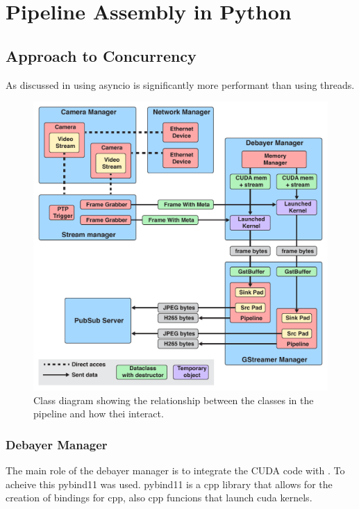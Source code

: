 
\chapter{Pipeline Assembly in Python}
\label{chap:pipeline}

\section{Approach to Concurrency}
As discussed in \todo using \gls{asyncio} is significantly more performant than using threads.





\begin{figure}
    \centering
    \includegraphics[width=\textwidth]{figures/object_overview.pdf}
    \caption{Class diagram showing the relationship between the classes in the pipeline and how thei interact.}
    \label{fig:pipeline_current}
\end{figure}

\subsection{Debayer Manager}
The main role of the debayer manager is to integrate the CUDA code with \py.
To acheive this \gls{pybind11} was used.
\gls{pybind11} is a \gls{cpp} library that allows for the creation of \py bindings for \gls{cpp}, also \gls{cpp} funcions that launch \gls{cuda} kernels.

